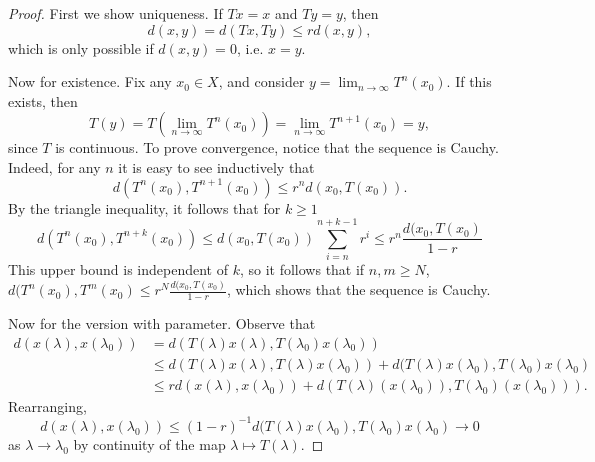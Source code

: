 \documentclass[12pt]{article}
\begin{document}
\begin{proof}First we show uniqueness. If $Tx = x$ and $Ty = y$, then \[d(x,y) = d(Tx,Ty) \leq r d(x,y),\]
which is only possible if $d(x,y) = 0$, i.e. $x=y$.

Now for existence. Fix any $x_0 \in X$, and consider $y = \lim_{n \to \infty} T^n(x_0)$. If this exists, then
\[T(y) = T\left(\lim_{n \to \infty}T^{n}(x_0)\right) = \lim_{n \to \infty}T^{n+1}(x_0) = y,\]
since $T$ is continuous. To prove convergence, notice that the sequence is Cauchy. Indeed, for any $n$ it is easy to see inductively that
\[d(T^n(x_0),T^{n+1}(x_0)) \leq r^n d(x_0,T(x_0)).\] By the triangle inequality, it follows that for $k \geq 1$
\[d(T^n(x_0),T^{n+k}(x_0)) \leq d(x_0,T(x_0))\sum_{i=n}^{n+k-1} r^i \leq r^n\frac{d(x_0,T(x_0)}{1-r}\]
This upper bound is independent of $k$, so it follows that if $n,m \geq N$, $d(T^n(x_0),T^m(x_0) \leq r^N\frac{d(x_0,T(x_0)}{1-r}$, which shows that the sequence is Cauchy.

Now for the version with parameter. Observe that
\begin{align*}
d(x(\lambda),x(\lambda_0)) &= d(T(\lambda)x(\lambda),T(\lambda_0)x(\lambda_0))\\
&\leq d(T(\lambda)x(\lambda),T(\lambda)x(\lambda_0)) + d(T(\lambda)x(\lambda_0),T(\lambda_0)x(\lambda_0)\\
&\leq rd(x(\lambda),x(\lambda_0)) + d(T(\lambda)(x(\lambda_0)),T(\lambda_0)(x(\lambda_0))).\end{align*}
Rearranging,
\[d(x(\lambda),x(\lambda_0)) \leq (1-r)^{-1} d(T(\lambda)x(\lambda_0),T(\lambda_0)x(\lambda_0) \to 0\] as $\lambda \to \lambda_0$ by continuity of the map $\lambda \mapsto T(\lambda)$.\end{proof}
\end{document}

